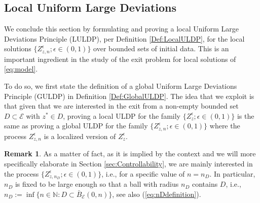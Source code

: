 \documentclass[10pt, reqno]{amsart}
\newcommand{\N}{\mathbb{N}}
\newcommand{\e}{\mathcal{E}}
\theoremstyle{definition}
\newtheorem{rem}{Remark}
\numberwithin{lem}{section}
\numberwithin{cor}{section}
\numberwithin{prop}{section}
\numberwithin{thm}{section}
\numberwithin{dfn}{section}
\begin{document}
  \subsection{Local Uniform Large Deviations}\label{sec:LULDP}   
        We conclude this section by formulating and proving a local  Uniform Large Deviations Principle (LULDP), per Definition \ref{Def:LocalULDP}, for the local solutions $\{Z_{z,n}^\epsilon; \epsilon\in(0,1)\}$ over bounded sets of initial data. This is an important ingredient in the study of the exit problem for local solutions of \eqref{eq:model}.
        
        To do so, we first state the definition of a global Uniform Large Deviations Principle (GULDP) in Definition \ref{Def:GlobalULDP}. The idea that we exploit is that given that we are interested in the exit from a  non-empty bounded set  $D\subset\e$ with $z^*\in D$, proving a local ULDP for the family $\{Z_z^\epsilon; \epsilon\in(0,1)\}$ is the same as proving a global ULDP for the family $\{Z_{z,n}^\epsilon; \epsilon\in(0,1)\}$ where the process $Z_{z,n}^\epsilon$ is a localized version of $Z_z^\epsilon$. 
        
       \begin{rem} As a matter of fact, as it is implied by the context and we will more specifically elaborate in Section \ref{sec:Controllability}, we are mainly interested in the process $\{Z_{z,n_{D}}^\epsilon; \epsilon\in(0,1)\}$, i.e., for a specific value of $n=n_D$. In particular, $n_D$ is fixed to be large enough so that a ball with radius $n_D$ contains $D$, i.e., $n_D:=\inf\big\{ n\in\N: D\subset \bar{B}_\e(0, n)\}$, see also  (\ref{eq:nDdefinition}).
        \end{rem}
\end{document}
